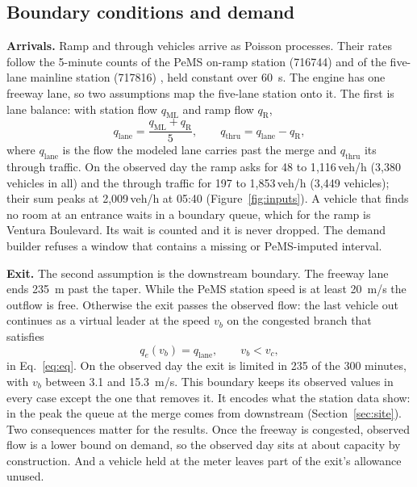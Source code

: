 \documentclass[11pt,letterpaper]{article}
\newcommand{\vehh}{\,veh/h}
\begin{document}
\subsection{Boundary conditions and demand}\label{sec:boundary}

\textbf{Arrivals.} Ramp and through vehicles arrive as Poisson processes. Their rates
follow the 5-minute counts of the PeMS on-ramp station (716744) and of the five-lane
mainline station (717816) \cite{pems}, held constant over 60~s. The engine has one
freeway lane, so two assumptions map the five-lane station onto it. The first is lane
balance: with station flow $q_\text{ML}$ and ramp flow $q_\text{R}$,
\begin{equation}
q_\text{lane}=\frac{q_\text{ML}+q_\text{R}}{5},\qquad
q_\text{thru}=q_\text{lane}-q_\text{R},
\label{eq:balance}
\end{equation}
where $q_\text{lane}$ is the flow the modeled lane carries past the merge and
$q_\text{thru}$ its through traffic. On the observed day the ramp asks for 48 to
1{,}116\vehh{} (3{,}380 vehicles in all) and the through traffic for 197 to
1{,}853\vehh{} (3{,}449 vehicles); their sum peaks at 2{,}009\vehh{} at 05:40
(Figure~\ref{fig:inputs}). A vehicle that finds no room at an entrance waits in a
boundary queue, which for the ramp is Ventura Boulevard. Its wait is counted and it is
never dropped. The demand builder refuses a window that contains a missing or
PeMS-imputed interval.

\textbf{Exit.} The second assumption is the downstream boundary. The freeway lane ends
235~m past the taper. While the PeMS station speed is at least 20~m/s the outflow is
free. Otherwise the exit passes the observed flow: the last vehicle out continues as a
virtual leader at the speed $v_b$ on the congested branch that satisfies
\begin{equation}
q_e(v_b)=q_\text{lane},\qquad v_b<v_c ,
\label{eq:exit}
\end{equation}
in Eq.~\eqref{eq:eq}. On the observed day the exit is limited in 235 of the 300 minutes,
with $v_b$ between 3.1 and 15.3~m/s. This boundary keeps its observed values in every
case except the one that removes it. It encodes what the station data show: in the peak
the queue at the merge comes from downstream (Section~\ref{sec:site}). Two consequences
matter for the results. Once the freeway is congested, observed flow is a lower bound
on demand, so the observed day sits at about capacity by construction. And a vehicle
held at the meter leaves part of the exit's allowance unused.
\end{document}
